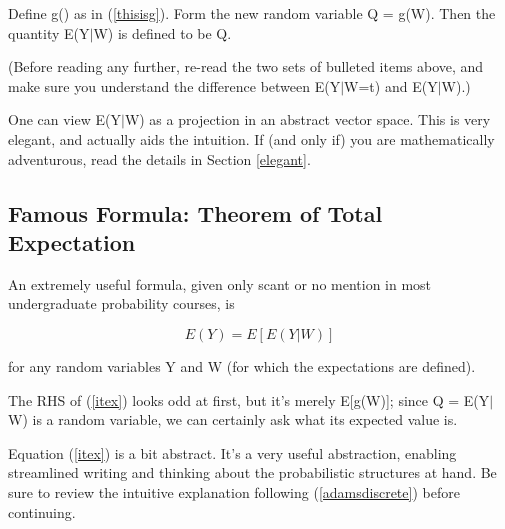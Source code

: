 \documentclass[11pt]{article}
\begin{document}
\begin{definition}

Define g() as in (\ref{thisisg}).  Form the new random variable Q =
g(W).  Then the quantity E(Y$|$W) is defined to be Q. 

\end{definition}

(Before reading any further, re-read the two sets of bulleted items
above, and make sure you understand the difference between E(Y$|$W=t)
and E(Y$|$W).)

One can view E(Y$|$W) as a projection in an abstract vector space.  This
is very elegant, and actually aids the intuition.  If (and only if) you
are mathematically adventurous, read the details in Section
\ref{elegant}.

\subsection{Famous Formula: Theorem of Total Expectation}

An extremely useful formula, given only scant or no mention in
most undergraduate probability courses, is 

\begin{equation}
\label{itex}
E(Y)=E[E(Y|W)]
\end{equation}

for any random variables Y and W (for which the expectations are
defined).  

The RHS of (\ref{itex}) looks odd at first, but it's merely E[g(W)];
since Q =  E(Y$|$W) is a random variable, we can certainly ask what its
expected value is.

Equation (\ref{itex}) is a bit abstract.  It's a very useful
abstraction, enabling streamlined writing and thinking about the
probabilistic structures at hand.  Be sure to review the intuitive
explanation following (\ref{adamsdiscrete}) before continuing.

% 
% 
% 
\end{document}
